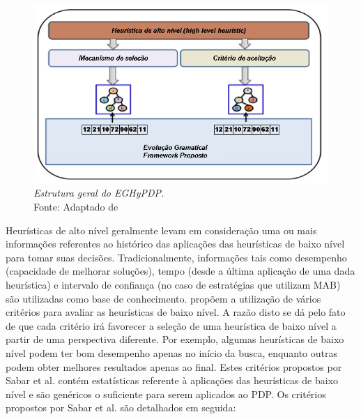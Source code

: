 \begin{figure}[!htb]
	\centering
	\includegraphics[scale=.98]{Imagens/proposedFramework.png}
	\caption{ \textit{Estrutura geral do EGHyPDP.} \\ Fonte: Adaptado de \cite{sabar2015automatic}}
	\label{fig:proposedFramework}
\end{figure}


Heurísticas de alto nível geralmente levam em consideração uma ou mais informações referentes ao histórico das aplicações das heurísticas de baixo nível para tomar suas decisões. Tradicionalmente, informações tais como desempenho (capacidade de melhorar soluções), tempo (desde a última aplicação de uma dada heurística) e intervalo de confiança (no caso de estratégias que utilizam MAB) são utilizadas como base de conhecimento. \cite{sabar2015automatic} propõem a utilização de vários critérios para avaliar as heurísticas de baixo nível. A razão disto se dá pelo fato de que cada critério irá favorecer a seleção de uma heurística de baixo nível a partir de uma perspectiva diferente. Por exemplo, algumas heurísticas de baixo nível podem ter bom desempenho apenas no início da busca, enquanto outras podem obter melhores resultados apenas ao final. Estes critérios propostos por Sabar et al. \cite{sabar2015automatic} contém estatísticas referente à aplicações das heurísticas de baixo nível e são genéricos o suficiente para serem aplicados ao PDP. Os critérios propostos por Sabar et al. \cite{sabar2015automatic} são detalhados em seguida:



